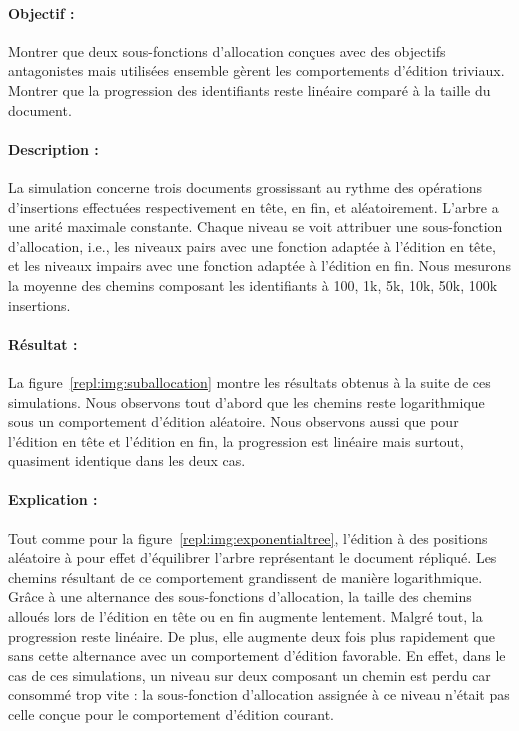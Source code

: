 \paragraph{Objectif :} Montrer que deux sous-fonctions d'allocation conçues avec
des objectifs antagonistes mais utilisées ensemble gèrent les comportements
d'édition triviaux. Montrer que la progression des identifiants reste linéaire
comparé à la taille du document.

\paragraph{Description :} La simulation concerne trois documents grossissant au
rythme des opérations d'insertions effectuées respectivement en tête, en fin, et
aléatoirement. L'arbre a une arité maximale constante. Chaque niveau se voit
attribuer une sous-fonction d'allocation, i.e., les niveaux pairs avec une
fonction adaptée à l'édition en tête, et les niveaux impairs avec une fonction
adaptée à l'édition en fin. Nous mesurons la moyenne des chemins composant les
identifiants à 100, 1k, 5k, 10k, 50k, 100k insertions.

\paragraph{Résultat :} La figure~\ref{repl:img:suballocation} montre les
résultats obtenus à la suite de ces simulations. Nous observons tout d'abord que
les chemins reste logarithmique sous un comportement d'édition aléatoire. Nous
observons aussi que pour l'édition en tête et l'édition en fin, la progression
est linéaire mais surtout, quasiment identique dans les deux cas.

\paragraph{Explication :} Tout comme pour la
figure~\ref{repl:img:exponentialtree}, l'édition à des positions aléatoire à
pour effet d'équilibrer l'arbre représentant le document répliqué. Les chemins
résultant de ce comportement grandissent de manière logarithmique. Grâce à une
alternance des sous-fonctions d'allocation, la taille des chemins alloués lors
de l'édition en tête ou en fin augmente lentement. Malgré tout, la progression
reste linéaire. De plus, elle augmente deux fois plus rapidement que sans cette
alternance avec un comportement d'édition favorable. En effet, dans le cas de
ces simulations, un niveau sur deux composant un chemin est perdu car consommé
trop vite : la sous-fonction d'allocation assignée à ce niveau n'était pas celle
conçue pour le comportement d'édition courant.


